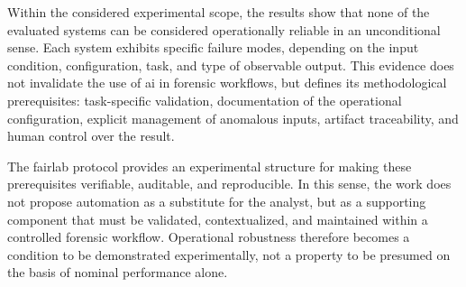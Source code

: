 Within the considered experimental scope, the results show that none of the
evaluated systems can be considered operationally reliable in an unconditional
sense. Each system exhibits specific failure modes, depending on the input
condition, configuration, task, and type of observable output. This evidence
does not invalidate the use of \gls{ai} in forensic workflows, but defines its
methodological prerequisites: task-specific validation, documentation of the
operational configuration, explicit management of anomalous inputs, artifact
traceability, and human control over the result.

The \gls{fairlab} protocol provides an experimental structure for making these
prerequisites verifiable, auditable, and reproducible. In this sense, the work
does not propose automation as a substitute for the analyst, but as a supporting
component that must be validated, contextualized, and maintained within a
controlled forensic workflow. Operational robustness therefore becomes a
condition to be demonstrated experimentally, not a property to be presumed on
the basis of nominal performance alone.

